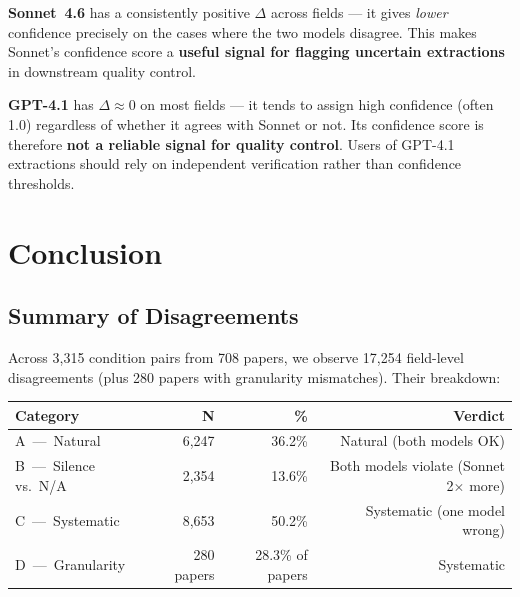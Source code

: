 \documentclass[11pt,a4paper]{article}
\begin{document}
\begin{tcolorbox}[
  colback=green!4!white, colframe=green!50!black,
  title={\textbf{Key finding: confidence calibration}},
  fonttitle=\small\sffamily, breakable,
]
\textbf{Sonnet~4.6} has a consistently positive $\Delta$ across fields ---
it gives \emph{lower} confidence precisely on the cases where the two models
disagree.  This makes Sonnet's confidence score a \textbf{useful signal for
flagging uncertain extractions} in downstream quality control.

\medskip
\textbf{GPT-4.1} has $\Delta \approx 0$ on most fields --- it tends to
assign high confidence (often 1.0) regardless of whether it agrees with Sonnet
or not.  Its confidence score is therefore \textbf{not a reliable signal for
quality control}.  Users of GPT-4.1 extractions should rely on independent
verification rather than confidence thresholds.
\end{tcolorbox}



        \section{Conclusion}

        \subsection{Summary of Disagreements}
        Across 3,315 condition pairs from 708 papers, we observe
        17,254 field-level disagreements (plus 280 papers with
        granularity mismatches).  Their breakdown:

        \begin{center}
        \begin{tabular}{lrrr}
        \toprule
        \textbf{Category} & \textbf{N} & \textbf{\%} & \textbf{Verdict} \\
        \midrule
        A~---~Natural & 6,247 & 36.2\% & Natural (both models OK) \\
        B~---~Silence vs.~N/A & 2,354 & 13.6\% & Both models violate (Sonnet 2$\times$ more) \\
        C~---~Systematic & 8,653 & 50.2\% & Systematic (one model wrong) \\
        D~---~Granularity & 280 papers & 28.3\% of papers & Systematic \\
        \bottomrule
        \end{tabular}
        \end{center}
\end{document}
